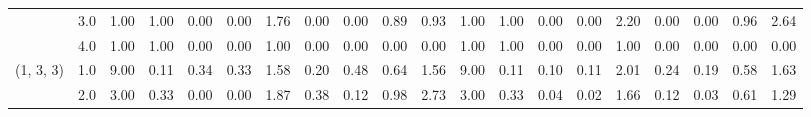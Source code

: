 \begin{tabular}{llrrrrrrrrrrrrrrrrrr}
          & 3.0 &               1.00 &                     1.00 &                                 0.00 &                             0.00 &                           1.76 &                                               0.00 &                                            0.00 &                                            0.89 &                                        0.93 &               1.00 &                     1.00 &                                 0.00 &                             0.00 &                           2.20 &                                               0.00 &                                            0.00 &                                            0.96 &                                        2.64 \\
          & 4.0 &               1.00 &                     1.00 &                                 0.00 &                             0.00 &                           1.00 &                                               0.00 &                                            0.00 &                                            0.00 &                                        0.00 &               1.00 &                     1.00 &                                 0.00 &                             0.00 &                           1.00 &                                               0.00 &                                            0.00 &                                            0.00 &                                        0.00 \\
(1, 3, 3) & 1.0 &               9.00 &                     0.11 &                                 0.34 &                             0.33 &                           1.58 &                                               0.20 &                                            0.48 &                                            0.64 &                                        1.56 &               9.00 &                     0.11 &                                 0.10 &                             0.11 &                           2.01 &                                               0.24 &                                            0.19 &                                            0.58 &                                        1.63 \\
          & 2.0 &               3.00 &                     0.33 &                                 0.00 &                             0.00 &                           1.87 &                                               0.38 &                                            0.12 &                                            0.98 &                                        2.73 &               3.00 &                     0.33 &                                 0.04 &                             0.02 &                           1.66 &                                               0.12 &                                            0.03 &                                            0.61 &                                        1.29 \\

\end{tabular}
